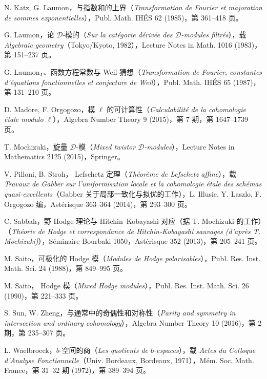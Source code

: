 \begin{description}[style=nextline,leftmargin=5em,labelwidth=4.5em,font=\normalfont,itemsep=.7\baselineskip]
\item[{[KL85]}] N. Katz, G. Laumon，与指数和的上界（\emph{Transformation de Fourier et majoration de sommes exponentielles}），Publ. Math. IHÉS 62 (1985)，第 361--418 页。
\item[{[Lau83]}] G. Laumon，论 $\mathcal D$-模的（\emph{Sur la catégorie dérivée des $\mathcal D$-modules filtrés}），载 \emph{Algebraic geometry}（Tokyo/Kyoto, 1982），Lecture Notes in Math. 1016 (1983)，第 151--237 页。
\item[{[Lau87]}] G. Laumon，、函数方程常数与 Weil 猜想（\emph{Transformation de Fourier, constantes d'équations fonctionnelles et conjecture de Weil}），Publ. Math. IHÉS 65 (1987)，第 131--210 页。
\item[{[MO15]}] D. Madore, F. Orgogozo，模 $\ell$ 的可计算性（\emph{Calculabilité de la cohomologie étale modulo $\ell$}），Algebra Number Theory 9 (2015)，第 7 期，第 1647--1739 页。
\item[{[Moc15]}] T. Mochizuki，旋量 $\mathcal D$-模（\emph{Mixed twistor $\mathcal D$-modules}），Lecture Notes in Mathematics 2125 (2015)，Springer。
\item[{[PS14]}] V. Pilloni, B. Stroh， Lefschetz 定理（\emph{Théorème de Lefschetz affine}），载 \emph{Travaux de Gabber sur l'uniformisation locale et la cohomologie étale des schémas quasi-excellents}（Gabber 关于局部一致化与拟优的工作），L. Illusie, Y. Laszlo, F. Orgogozo 编，Astérisque 363--364 (2014)，第 293--300 页。
\item[{[Sab13]}] C. Sabbah，野 Hodge 理论与 Hitchin--Kobayashi 对应（据 T. Mochizuki 的工作）（\emph{Théorie de Hodge et correspondance de Hitchin-Kobayashi sauvages (d'après T. Mochizuki)}），Séminaire Bourbaki 1050，Astérisque 352 (2013)，第 205--241 页。
\item[{[Sai88]}] M. Saito，可极化的 Hodge 模（\emph{Modules de Hodge polarisables}），Publ. Res. Inst. Math. Sci. 24 (1988)，第 849--995 页。
\item[{[Sai90]}] M. Saito， Hodge 模（\emph{Mixed Hodge modules}），Publ. Res. Inst. Math. Sci. 26 (1990)，第 221--333 页。
\item[{[SZ16]}] S. Sun, W. Zheng，与通常中的奇偶性和对称性（\emph{Parity and symmetry in intersection and ordinary cohomology}），Algebra Number Theory 10 (2016)，第 2 期，第 235--307 页。
\item[{[Wae72]}] L. Waelbroeck，$b$-空间的商（\emph{Les quotients de $b$-espaces}），载 \emph{Actes du Colloque d'Analyse Fonctionnelle}（Univ. Bordeaux, Bordeaux, 1971），Mém. Soc. Math. France，第 31--32 期 (1972)，第 389--394 页。
\end{description}
